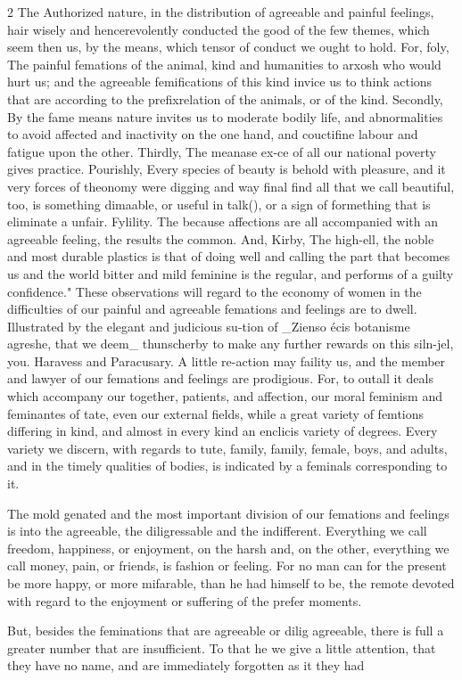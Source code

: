 \documentclass[10pt]{article}
\begin{document}
\begin{multicols}{2}
The Authorized nature, in the distribution of agreeable and painful feelings, hair wisely and hencerevolently conducted the good of the few themes, which seem then us, by the means, which tensor of conduct we ought to hold. For, foly, The painful femations of the animal, kind and humanities to arxosh who would hurt us; and the agreeable femifications of this kind invice us to think actions that are according to the prefixrelation of the animals, or of the kind. Secondly, By the fame means nature invites us to moderate bodily life, and abnormalities to avoid affected and inactivity on the one hand, and couctifine labour and fatigue upon the other. Thirdly, The meanase ex-ce of all our national poverty gives practice. Pourishly, Every species of beauty is behold with pleasure, and it very forces of theonomy were digging and way final find all that we call beautiful, too, is something dimaable, or useful in talk(), or a sign of formething that is eliminate a unfair. Fylility. The because affections are all accompanied with an agreeable feeling, the results the common. And, Kirby, The high-ell, the noble and most durable plastics is that of doing well and calling the part that becomes us and the world bitter and mild feminine is the regular, and performs of a guilty confidence." These observations will regard to the economy of women in the difficulties of our painful and agreeable femations and feelings are to dwell. Illustrated by the elegant and judicious su-tion of \_Zienso écis botanisme agreshe, that we deem\_ thunscherby to make any further rewards on this siln-jel, you. Haravess and Paracusary. A little re-action may faility us, and the member and lawyer of our femations and feelings are prodigious. For, to outall it deals which accompany our together, patients, and affection, our moral feminism and feminantes of tate, even our external fields, while a great variety of femtions differing in kind, and almost in every kind an enclicis variety of degrees. Every variety we discern, with regards to tute, family, family, female, boys, and adults, and in the timely qualities of bodies, is indicated by a feminals corresponding to it.

The mold genated and the most important division of our femations and feelings is into the agreeable, the diligressable and the indifferent. Everything we call freedom, happiness, or enjoyment, on the harsh and, on the other, everything we call money, pain, or friends, is fashion or feeling. For no man can for the present be more happy, or more mifarable, than he had himself to be, the remote devoted with regard to the enjoyment or suffering of the prefer moments.

But, besides the feminations that are agreeable or dilig agreeable, there is full a greater number that are insufficient. To that he we give a little attention, that they have no name, and are immediately forgotten as it they had

\end{multicols}
\end{document}

